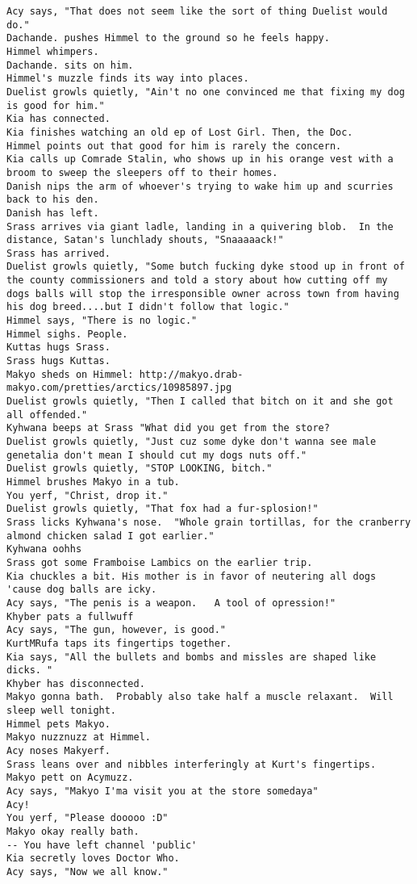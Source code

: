 \begin{verbatim}
Acy says, "That does not seem like the sort of thing Duelist would do."
Dachande. pushes Himmel to the ground so he feels happy.
Himmel whimpers.
Dachande. sits on him.
Himmel's muzzle finds its way into places.
Duelist growls quietly, "Ain't no one convinced me that fixing my dog is good for him."
Kia has connected.
Kia finishes watching an old ep of Lost Girl. Then, the Doc.
Himmel points out that good for him is rarely the concern.
Kia calls up Comrade Stalin, who shows up in his orange vest with a broom to sweep the sleepers off to their homes.
Danish nips the arm of whoever's trying to wake him up and scurries back to his den.
Danish has left.
Srass arrives via giant ladle, landing in a quivering blob.  In the distance, Satan's lunchlady shouts, "Snaaaaack!"
Srass has arrived.
Duelist growls quietly, "Some butch fucking dyke stood up in front of the county commissioners and told a story about how cutting off my dogs balls will stop the irresponsible owner across town from having his dog breed....but I didn't follow that logic."
Himmel says, "There is no logic."
Himmel sighs. People.
Kuttas hugs Srass.
Srass hugs Kuttas.
Makyo sheds on Himmel: http://makyo.drab-makyo.com/pretties/arctics/10985897.jpg
Duelist growls quietly, "Then I called that bitch on it and she got all offended."
Kyhwana beeps at Srass "What did you get from the store?
Duelist growls quietly, "Just cuz some dyke don't wanna see male genetalia don't mean I should cut my dogs nuts off."
Duelist growls quietly, "STOP LOOKING, bitch."
Himmel brushes Makyo in a tub.
You yerf, "Christ, drop it."
Duelist growls quietly, "That fox had a fur-splosion!"
Srass licks Kyhwana's nose.  "Whole grain tortillas, for the cranberry almond chicken salad I got earlier."
Kyhwana oohhs
Srass got some Framboise Lambics on the earlier trip.
Kia chuckles a bit. His mother is in favor of neutering all dogs 'cause dog balls are icky.
Acy says, "The penis is a weapon.   A tool of opression!"
Khyber pats a fullwuff
Acy says, "The gun, however, is good."
KurtMRufa taps its fingertips together.
Kia says, "All the bullets and bombs and missles are shaped like dicks. "
Khyber has disconnected.
Makyo gonna bath.  Probably also take half a muscle relaxant.  Will sleep well tonight.
Himmel pets Makyo.
Makyo nuzznuzz at Himmel.
Acy noses Makyerf.
Srass leans over and nibbles interferingly at Kurt's fingertips.
Makyo pett on Acymuzz.
Acy says, "Makyo I'ma visit you at the store somedaya"
Acy!
You yerf, "Please dooooo :D"
Makyo okay really bath.
-- You have left channel 'public'
Kia secretly loves Doctor Who.
Acy says, "Now we all know."

\end{verbatim}
